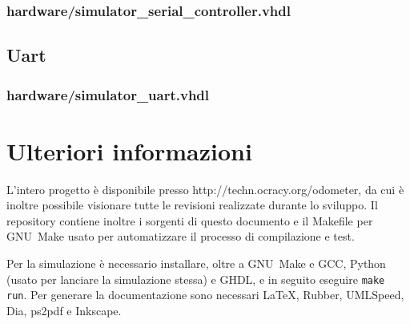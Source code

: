 \documentclass [11pt,a4paper,oneside]{paper}
\newcommand{\href}[2]{#2}
\newcommand{\link}[1]{\href{#1}{#1}}
\newcommand{\inputVHDL}[1]{}
\begin{document}
\subsubsection{hardware/simulator\_serial\_controller.vhdl}
\inputVHDL{hardware/simulator_serial_controller.vhdl}

\subsection{Uart}
\subsubsection{hardware/simulator\_uart.vhdl}
\inputVHDL{hardware/simulator_uart.vhdl}


\section{Ulteriori informazioni}
L'intero progetto è disponibile presso \link{http://techn.ocracy.org/odometer}, da cui
è inoltre possibile visionare tutte le revisioni realizzate durante lo sviluppo.
Il repository contiene inoltre i sorgenti di questo documento e il Makefile
per GNU~Make usato per automatizzare il processo di compilazione e test.

Per la simulazione è necessario installare, oltre a GNU~Make e GCC, Python
(usato per lanciare la simulazione stessa) e GHDL, e in seguito eseguire
\texttt{make run}. Per generare la documentazione sono necessari \LaTeX,
Rubber, UMLSpeed, Dia, ps2pdf e Inkscape.
\end{document}
